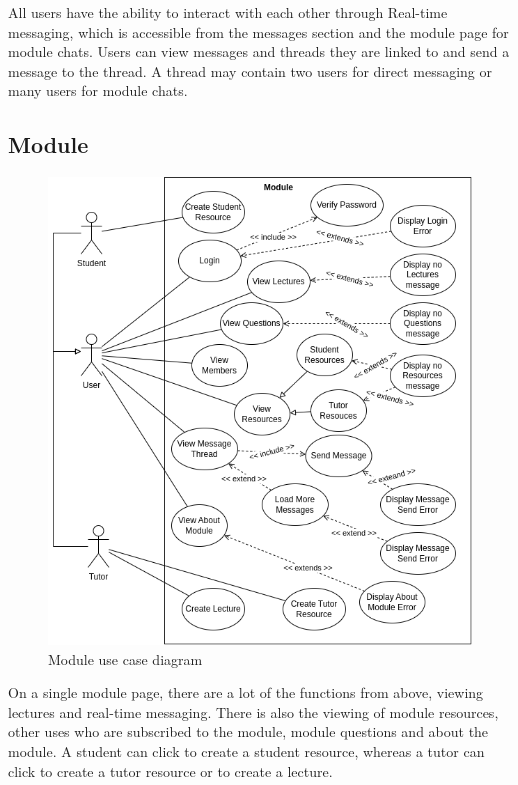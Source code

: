 All users have the ability to interact with each other through Real-time messaging, which is accessible from the messages section and the module page for module chats. Users can view messages and threads they are linked to and send a message to the thread. A thread may contain two users for direct messaging or many users for module chats.

\subsection{Module}
 
\begin{figure}[H]
    \centering
    \includegraphics[scale=0.36]{images/use cases/module.png}
    \caption{Module use case diagram}
    \label{fig:my_label}
\end{figure}

On a single module page, there are a lot of the functions from above, viewing lectures and real-time messaging. There is also the viewing of module resources, other uses who are subscribed to the module, module questions and about the module. A student can click to create a student resource, whereas a tutor can click to create a tutor resource or to create a lecture.

